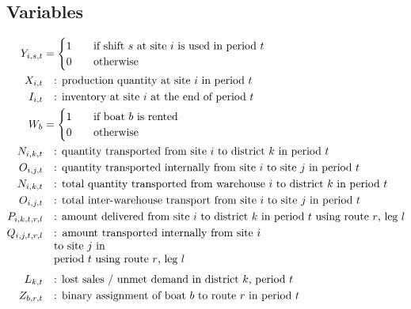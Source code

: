 \documentclass[10pt]{article}
\begin{document}
\subsection{Variables}
\begin{align}
    Y_{i,s,t} &=
    \begin{cases}
        1 & \quad\text{if shift $s $ at site $i $ is used in period $t $}\\
        0 & \quad\text{otherwise}
    \end{cases}\\
    X_{i, t} & \quad\text{: production quantity at site $i $ in period $t $}\\
    I_{i, t}& \quad\text{: inventory at site $i $ at the end of period $t $}\\
    W_b &=
    \begin{cases}
        1 & \quad\text{if boat $b $ is rented}\\
        0 & \quad\text{otherwise}
    \end{cases}\\
    N_{i, k, t}& \quad\text{: quantity transported from site $i $ to district $k $ in period $t $}\\
    O_{i, j, t}& \quad\text{: quantity transported internally from site $i $ to site $j $ in period $t $}\\
    N_{i, k, t}& \quad\text{: total quantity transported from warehouse $i $ to district $k $ in period $t $}\\
    O_{i, j, t}& \quad\text{: total inter-warehouse transport from site $ i $ to site $j $ in period $t $}\\
    P_{i, k, t, r, l}& \quad\text{: amount delivered from site $i $ to district $k $ in period $t $ using route $r $, leg $l $}\\
    Q_{i, j, t, r, l}& \quad\parbox[t]{0.55\linewidth}{: amount transported internally from site $i $ to site $j $ in \\ period $t $ using route $r $, leg $l $}\\[1ex]
    L_{k, t}& \quad\text{: lost sales / unmet demand in district $k $, period $t $}\\
    Z_{b, r, t}& \quad\text{: binary assignment of boat $b $ to route $r $ in period $t $}
\end{align}
\end{document}
